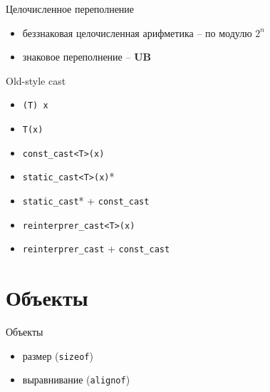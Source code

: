 \documentclass[unknownkeysallowed,xcolor=table]{beamer}
\begin{document}
\begin{frame}{Целочисленное переполнение}
  \begin{itemize}
    \item беззнаковая целочисленная арифметика -- по модулю $2^n$ \vspace{2em}
    \item знаковое переполнение -- \textbf{UB}
  \end{itemize}
\end{frame}

\begin{frame}[fragile]{Old-style cast}
  \begin{minipage}{.45\textwidth}
    \begin{itemize}
      \item \lstinline{(T) x}
      \item \lstinline{T(x)}
    \end{itemize}
  \end{minipage}\hfill
  \begin{minipage}{.45\textwidth}
    \begin{itemize}
      \item \lstinline{const_cast<T>(x)} \vspace{0.5em}
      \item \lstinline{static_cast<T>(x)}* \vspace{0.5em}
      \item \lstinline{static_cast}* + \lstinline{const_cast} \vspace{0.5em}
      \item \lstinline{reinterprer_cast<T>(x)}
      \item \lstinline{reinterprer_cast} + \lstinline{const_cast}
    \end{itemize}
  \end{minipage}
\end{frame}

\section{Объекты}

\begin{frame}{Объекты}
  \begin{itemize}
    \item размер (\lstinline{sizeof})
    \item выравнивание (\lstinline{alignof})
  \end{itemize}
\end{frame}
\end{document}

